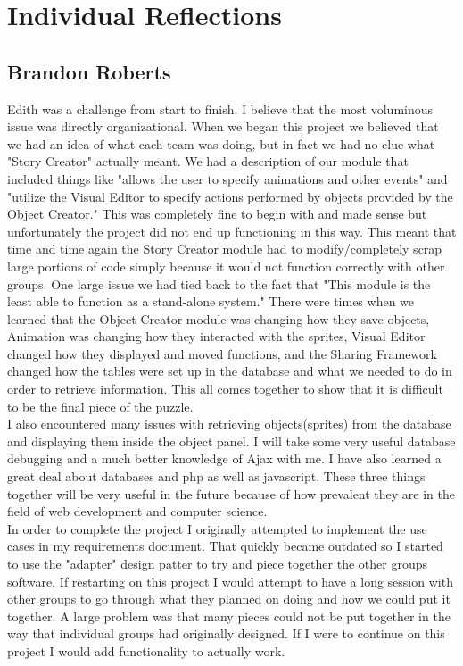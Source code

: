 \documentclass[12pt]{article}
\begin{document}
\section{Individual Reflections}

\subsection{Brandon Roberts}
Edith was a challenge from start to finish.  I believe that the most voluminous issue was directly organizational.  When we began this project we believed that we had an idea of what each team was doing, but in fact we had no clue what "Story Creator" actually meant.  We had a description of our module that included things like "allows the user to specify animations and other events" and "utilize the Visual Editor to specify actions performed by objects provided by the Object Creator."  This was completely fine to begin with and made sense but unfortunately the project did not end up functioning in this way.  This meant that time and time again the Story Creator module had to modify/completely scrap large portions of code simply because it would not function correctly with other groups.  One large issue we had tied back to the fact that "This module is the least able to function as a stand-alone system."  There were times when we learned that the Object Creator module was changing how they save objects, Animation was changing how they interacted with the sprites, Visual Editor changed how they displayed and moved functions, and the Sharing Framework changed how the tables were set up in the database and what we needed to do in order to retrieve information.  This all comes together to show that it is difficult to be the final piece of the puzzle.  \\

I also encountered many issues with retrieving objects(sprites) from the database and displaying them inside the object panel.  I will take some very useful database debugging and a much better knowledge of Ajax with me.  I have also learned a great deal about databases and php as well as javascript.  These three things together will be very useful in the future because of how prevalent they are in the field of web development and computer science. \\

In order to complete the project I originally attempted to implement the use cases in my requirements document.  That quickly became outdated so I started to use the "adapter" design patter to try and piece together the other groups software.  If restarting on this project I would attempt to have a long session with other groups to go through what they planned on doing and how we could put it together.  A large problem was that many pieces could not be put together in the way that individual groups  had originally designed.  If I were to continue on this project I would add functionality to actually work.
\end{document}

